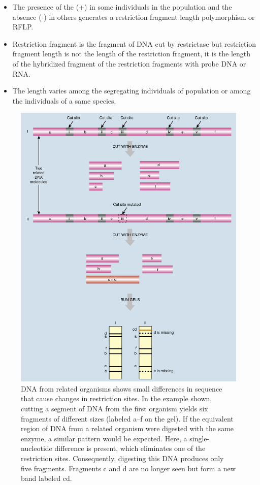 \documentclass[11pt,dvipsnames,ignorenonframetext,aspectratio=169]{beamer}
\providecommand{\tightlist}{%
  \setlength{\itemsep}{0pt}\setlength{\parskip}{0pt}}
\begin{document}
\begin{frame}{}
\protect\hypertarget{section-27}{}
\begin{itemize}
\tightlist
\item
  The presence of the (+) in some individuals in the population and the
  absence (-) in others generates a restriction fragment length
  polymorphism or RFLP.
\item
  Restriction fragment is the fragment of DNA cut by restrictase but
  restriction fragment length is not the length of the restriction
  fragment, it is the length of the hybridized fragment of the
  restriction fragments with probe DNA or RNA.
\item
  The length varies among the segregating individuals of population or
  among the individuals of a same species.
\end{itemize}
\end{frame}

\begin{frame}{}
\protect\hypertarget{section-28}{}
\begin{figure}
\includegraphics[width=0.35\linewidth]{./../images/rflp_analysis} \caption{DNA from related organisms shows small differences in sequence that cause changes in restriction sites. In the example shown, cutting a segment of DNA from the first organism yields six fragments of different sizes (labeled a–f on the gel). If the equivalent region of DNA from a related organism were digested with the same enzyme, a similar pattern would be expected. Here, a single-nucleotide difference is present, which eliminates one of the restriction sites. Consequently, digesting this DNA produces only five fragments. Fragments c and d are no longer seen but form a new band labeled cd.}\label{fig:rflp-analysis}
\end{figure}
\end{frame}
\end{document}
